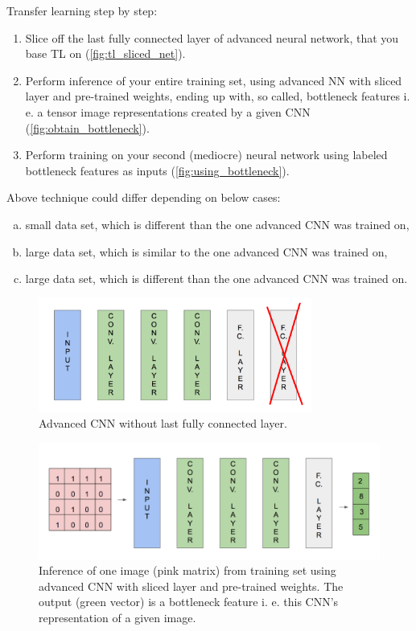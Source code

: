 \documentclass[11pt, a4paper]{article}
\begin{document}
Transfer learning step by step:
\begin{enumerate}[1)]
\item Slice off the last fully connected layer of advanced neural network, that you base TL on (\autoref{fig:tl_sliced_net}).
\item Perform inference of your entire training set, using advanced NN with sliced layer and pre-trained weights, ending up with, so called, bottleneck features i. e. a tensor image representations created by a given CNN (\autoref{fig:obtain_bottleneck}).
\item Perform training on your second (mediocre) neural network using labeled bottleneck features as inputs (\autoref{fig:using_bottleneck}).
\end{enumerate}
Above technique could differ depending on below cases:
\begin{enumerate}[a)]
\item small data set, which is different than the one advanced CNN was trained on,
\item large data set, which is similar to the one advanced CNN was trained on,
\item large data set, which is different than the one advanced CNN was trained on.
\end{enumerate}

\begin{figure}[h]
\includegraphics[width=0.8\textwidth]{tl_sliced_net}
\centering
\caption[Zaawansowana konwolucyjna sieć neuronowa bez ostatniej warstwy]{Advanced CNN without last fully connected layer.}
\label{fig:tl_sliced_net}
\end{figure}

\begin{figure}[h]
\includegraphics[width=\textwidth]{obtain_bottleneck}
\centering
\caption[Wnioskowanie pierwszej sieci poprzez wykorzystanie tzw. bottleneck features]{Inference of one image (pink matrix) from training set using advanced CNN with sliced layer and pre-trained weights. The output (green vector) is a bottleneck feature i. e. this CNN's representation of a given image.}
\label{fig:obtain_bottleneck}
\end{figure}
\end{document}

